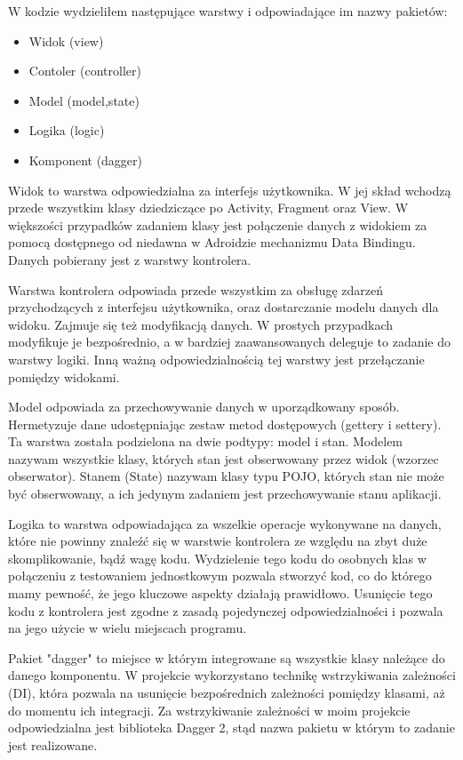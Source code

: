 \documentclass	{xmgr}
\begin{document}
W kodzie wydzieliłem następujące warstwy i odpowiadające im nazwy pakietów:
\begin{itemize}
	\item Widok (view)
	\item Contoler (controller)
	\item Model (model,state)
	\item Logika (logic)
	\item Komponent (dagger)
\end{itemize}

Widok to warstwa odpowiedzialna za interfejs użytkownika. W jej skład wchodzą przede wszystkim klasy dziedziczące po Activity, Fragment oraz View. W większości przypadków zadaniem klasy jest połączenie danych z widokiem za pomocą dostępnego od niedawna w Adroidzie mechanizmu Data Bindingu. Danych pobierany jest z warstwy kontrolera.

Warstwa kontrolera odpowiada przede wszystkim za obsługę zdarzeń przychodzących z interfejsu użytkownika, oraz dostarczanie modelu danych dla widoku. Zajmuje się też modyfikacją danych. W prostych przypadkach modyfikuje je bezpośrednio, a w bardziej zaawansowanych deleguje to zadanie do warstwy logiki. Inną ważną odpowiedzialnością tej warstwy jest przełączanie pomiędzy widokami. 

Model odpowiada za przechowywanie danych w uporządkowany sposób. Hermetyzuje dane udostępniając zestaw metod dostępowych (gettery i settery). Ta warstwa została podzielona na dwie podtypy: model i stan. Modelem nazywam wszystkie klasy, których stan jest obserwowany przez widok (wzorzec obserwator). Stanem (State) nazywam klasy typu POJO, których stan nie może być obserwowany, a ich jedynym zadaniem jest przechowywanie stanu aplikacji. 

Logika to warstwa odpowiadająca za wszelkie operacje wykonywane na danych, które nie powinny znaleźć się w warstwie kontrolera ze względu na zbyt duże skomplikowanie, bądź wagę kodu. Wydzielenie tego kodu do osobnych klas w połączeniu z testowaniem jednostkowym pozwala stworzyć kod, co do którego mamy pewność, że jego kluczowe aspekty działają prawidłowo. Usunięcie tego kodu z kontrolera jest zgodne z zasadą pojedynczej odpowiedzialności \cite{CleanCode:1000} i pozwala na jego użycie w wielu miejscach programu. 

Pakiet "dagger" to miejsce w którym integrowane są wszystkie klasy należące do danego komponentu. W projekcie wykorzystano technikę wstrzykiwania zależności (DI), która pozwala na usunięcie bezpośrednich zależności pomiędzy klasami, aż do momentu ich integracji. Za wstrzykiwanie zależności w moim projekcie odpowiedzialna jest biblioteka Dagger 2, stąd nazwa pakietu w którym to zadanie jest realizowane.
\end{document}
